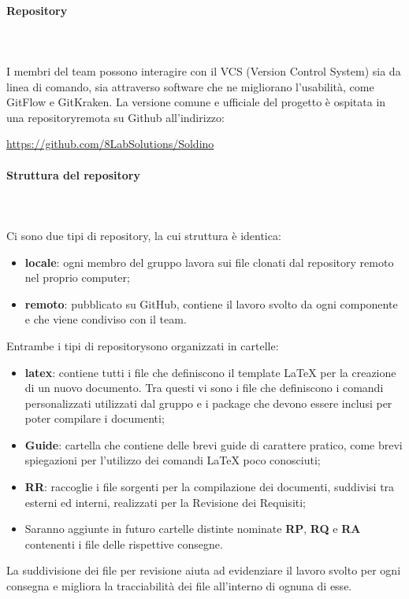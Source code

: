 	\paragraph{Repository} \mbox{}\\ \mbox{}\\
	I membri del team possono interagire con il VCS (Version Control System) sia da linea di comando, sia attraverso software che ne migliorano l'usabilità, come GitFlow e GitKraken. La versione comune e ufficiale del progetto è ospitata in una repository\glosp remota su Github all'indirizzo: \newline \newline
	\centerline{\url{https://github.com/8LabSolutions/Soldino}}
	\paragraph{Struttura del repository} \mbox{}\\ \mbox{}\\
	Ci sono due tipi di repository\glo{}, la cui struttura è identica:
	\begin{itemize}
		\item \textbf{locale}: ogni membro del gruppo lavora sui file clonati dal repository\glo{} remoto nel proprio computer;
		\item \textbf{remoto}: pubblicato su GitHub, contiene il lavoro svolto da ogni componente e che viene condiviso con il team.
	\end{itemize}						
	Entrambe i tipi di repository\glosp sono organizzati in cartelle:
	\begin{itemize}
		\item \textbf{latex}: contiene tutti i file che definiscono il template \LaTeX{} per la creazione di un nuovo documento. Tra questi vi sono i file che definiscono i comandi personalizzati utilizzati dal gruppo e i package che devono essere inclusi per poter compilare i documenti;
		\item \textbf{Guide}: cartella che contiene delle brevi guide di carattere pratico, come brevi spiegazioni per l'utilizzo dei comandi \LaTeX{} poco conosciuti;
		\item \textbf{RR}: raccoglie i file sorgenti per la compilazione dei documenti, suddivisi tra esterni ed interni, realizzati per la Revisione dei Requisiti;
		\item Saranno aggiunte in futuro cartelle distinte nominate \textbf{RP}, \textbf{RQ} e \textbf{RA} contenenti i file delle rispettive consegne.
	\end{itemize}
	La suddivisione dei file per revisione aiuta ad evidenziare il lavoro svolto per ogni consegna e migliora la tracciabilità dei file all'interno di ognuna di esse.
